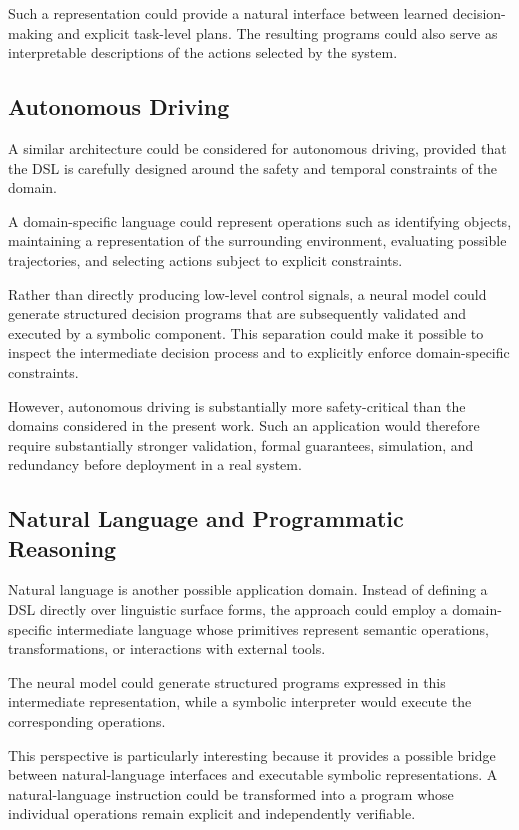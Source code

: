 \documentclass[final]{nesy2027}
\begin{document}
Such a representation could provide a natural interface between learned
decision-making and explicit task-level plans. The resulting programs could
also serve as interpretable descriptions of the actions selected by the
system.

\subsection{Autonomous Driving}
\label{subsec:perspectives-autonomous-driving}

A similar architecture could be considered for autonomous driving, provided
that the DSL is carefully designed around the safety and temporal constraints
of the domain.

A domain-specific language could represent operations such as identifying
objects, maintaining a representation of the surrounding environment,
evaluating possible trajectories, and selecting actions subject to explicit
constraints.
 
Rather than directly producing low-level control signals, a neural model
could generate structured decision programs that are subsequently validated
and executed by a symbolic component. This separation could make it possible
to inspect the intermediate decision process and to explicitly enforce
domain-specific constraints.

However, autonomous driving is substantially more safety-critical than the
domains considered in the present work. Such an application would therefore
require substantially stronger validation, formal guarantees, simulation, and
redundancy before deployment in a real system.

\subsection{Natural Language and Programmatic Reasoning}
\label{subsec:perspectives-language}

Natural language is another possible application domain. Instead of defining
a DSL directly over linguistic surface forms, the approach could employ a
domain-specific intermediate language whose primitives represent semantic
operations, transformations, or interactions with external tools.

The neural model could generate structured programs expressed in this
intermediate representation, while a symbolic interpreter would execute the
corresponding operations.

This perspective is particularly interesting because it provides a possible
bridge between natural-language interfaces and executable symbolic
representations. A natural-language instruction could be transformed into a
program whose individual operations remain explicit and independently
verifiable.
\end{document}
